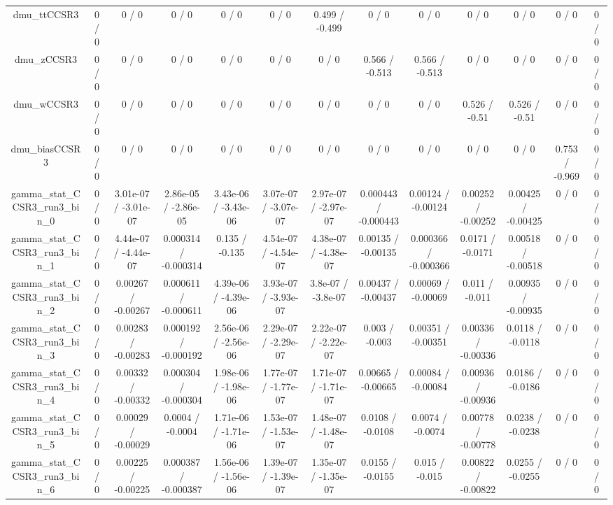\documentclass[10pt]{article}
\begin{document}
\begin{table}[htbp]
\begin{center}
\begin{tabular}{|c|c|c|c|c|c|c|c|c|c|c|c|c|}
  dmu_ttCCSR3 & 0 / 0 & 0 / 0 & 0 / 0 & 0 / 0 & 0 / 0 & 0.499 / -0.499 & 0 / 0 & 0 / 0 & 0 / 0 & 0 / 0 & 0 / 0 & 0 / 0 \\ 
  dmu_zCCSR3 & 0 / 0 & 0 / 0 & 0 / 0 & 0 / 0 & 0 / 0 & 0 / 0 & 0.566 / -0.513 & 0.566 / -0.513 & 0 / 0 & 0 / 0 & 0 / 0 & 0 / 0 \\ 
  dmu_wCCSR3 & 0 / 0 & 0 / 0 & 0 / 0 & 0 / 0 & 0 / 0 & 0 / 0 & 0 / 0 & 0 / 0 & 0.526 / -0.51 & 0.526 / -0.51 & 0 / 0 & 0 / 0 \\ 
  dmu_biasCCSR3 & 0 / 0 & 0 / 0 & 0 / 0 & 0 / 0 & 0 / 0 & 0 / 0 & 0 / 0 & 0 / 0 & 0 / 0 & 0 / 0 & 0.753 / -0.969 & 0 / 0 \\ 
  gamma_stat_CCSR3_run3_bin_0 & 0 / 0 & 3.01e-07 / -3.01e-07 & 2.86e-05 / -2.86e-05 & 3.43e-06 / -3.43e-06 & 3.07e-07 / -3.07e-07 & 2.97e-07 / -2.97e-07 & 0.000443 / -0.000443 & 0.00124 / -0.00124 & 0.00252 / -0.00252 & 0.00425 / -0.00425 & 0 / 0 & 0 / 0 \\ 
  gamma_stat_CCSR3_run3_bin_1 & 0 / 0 & 4.44e-07 / -4.44e-07 & 0.000314 / -0.000314 & 0.135 / -0.135 & 4.54e-07 / -4.54e-07 & 4.38e-07 / -4.38e-07 & 0.00135 / -0.00135 & 0.000366 / -0.000366 & 0.0171 / -0.0171 & 0.00518 / -0.00518 & 0 / 0 & 0 / 0 \\ 
  gamma_stat_CCSR3_run3_bin_2 & 0 / 0 & 0.00267 / -0.00267 & 0.000611 / -0.000611 & 4.39e-06 / -4.39e-06 & 3.93e-07 / -3.93e-07 & 3.8e-07 / -3.8e-07 & 0.00437 / -0.00437 & 0.00069 / -0.00069 & 0.011 / -0.011 & 0.00935 / -0.00935 & 0 / 0 & 0 / 0 \\ 
  gamma_stat_CCSR3_run3_bin_3 & 0 / 0 & 0.00283 / -0.00283 & 0.000192 / -0.000192 & 2.56e-06 / -2.56e-06 & 2.29e-07 / -2.29e-07 & 2.22e-07 / -2.22e-07 & 0.003 / -0.003 & 0.00351 / -0.00351 & 0.00336 / -0.00336 & 0.0118 / -0.0118 & 0 / 0 & 0 / 0 \\ 
  gamma_stat_CCSR3_run3_bin_4 & 0 / 0 & 0.00332 / -0.00332 & 0.000304 / -0.000304 & 1.98e-06 / -1.98e-06 & 1.77e-07 / -1.77e-07 & 1.71e-07 / -1.71e-07 & 0.00665 / -0.00665 & 0.00084 / -0.00084 & 0.00936 / -0.00936 & 0.0186 / -0.0186 & 0 / 0 & 0 / 0 \\ 
  gamma_stat_CCSR3_run3_bin_5 & 0 / 0 & 0.00029 / -0.00029 & 0.0004 / -0.0004 & 1.71e-06 / -1.71e-06 & 1.53e-07 / -1.53e-07 & 1.48e-07 / -1.48e-07 & 0.0108 / -0.0108 & 0.0074 / -0.0074 & 0.00778 / -0.00778 & 0.0238 / -0.0238 & 0 / 0 & 0 / 0 \\ 
  gamma_stat_CCSR3_run3_bin_6 & 0 / 0 & 0.00225 / -0.00225 & 0.000387 / -0.000387 & 1.56e-06 / -1.56e-06 & 1.39e-07 / -1.39e-07 & 1.35e-07 / -1.35e-07 & 0.0155 / -0.0155 & 0.015 / -0.015 & 0.00822 / -0.00822 & 0.0255 / -0.0255 & 0 / 0 & 0 / 0 \\ 

\end{tabular}
\end{center}
\end{table}
\end{document}
